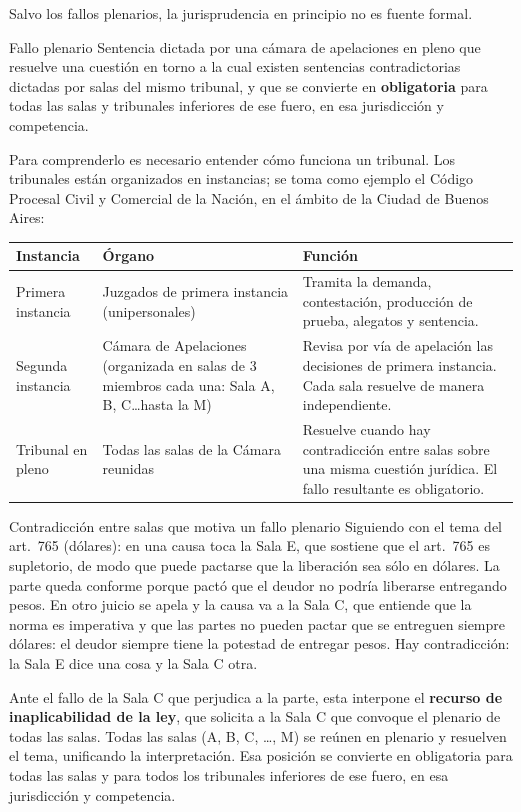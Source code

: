\documentclass[12pt,oneside]{book}
\begin{document}
Salvo los fallos plenarios, la jurisprudencia en principio no es fuente formal.

\begin{definition}{Fallo plenario}
Sentencia dictada por una cámara de apelaciones en pleno que resuelve una cuestión en torno a la cual existen sentencias contradictorias dictadas por salas del mismo tribunal, y que se convierte en \textbf{obligatoria} para todas las salas y tribunales inferiores de ese fuero, en esa jurisdicción y competencia.
\end{definition}

Para comprenderlo es necesario entender cómo funciona un tribunal. Los tribunales están organizados en instancias; se toma como ejemplo el Código Procesal Civil y Comercial de la Nación, en el ámbito de la Ciudad de Buenos Aires:

\begin{table}[H]
\centering
\begin{tabularx}{\textwidth}{>{\raggedright\arraybackslash}p{} >{\raggedright\arraybackslash}p{} >{\raggedright\arraybackslash}X}
\toprule
\textbf{Instancia} & \textbf{Órgano} & \textbf{Función} \\
\midrule
Primera instancia & Juzgados de primera instancia (unipersonales) & Tramita la demanda, contestación, producción de prueba, alegatos y sentencia. \\
\addlinespace
Segunda instancia & Cámara de Apelaciones (organizada en salas de 3 miembros cada una: Sala A, B, C\ldots hasta la M) & Revisa por vía de apelación las decisiones de primera instancia. Cada sala resuelve de manera independiente. \\
\addlinespace
Tribunal en pleno & Todas las salas de la Cámara reunidas & Resuelve cuando hay contradicción entre salas sobre una misma cuestión jurídica. El fallo resultante es obligatorio. \\
\bottomrule
\end{tabularx}
\end{table}

\begin{example}{Contradicción entre salas que motiva un fallo plenario}
Siguiendo con el tema del art.~765 (dólares): en una causa toca la Sala E, que sostiene que el art.~765 es supletorio, de modo que puede pactarse que la liberación sea sólo en dólares. La parte queda conforme porque pactó que el deudor no podría liberarse entregando pesos. En otro juicio se apela y la causa va a la Sala C, que entiende que la norma es imperativa y que las partes no pueden pactar que se entreguen siempre dólares: el deudor siempre tiene la potestad de entregar pesos. Hay contradicción: la Sala E dice una cosa y la Sala C otra.

Ante el fallo de la Sala C que perjudica a la parte, esta interpone el \textbf{recurso de inaplicabilidad de la ley}, que solicita a la Sala C que convoque el plenario de todas las salas. Todas las salas (A, B, C, \ldots, M) se reúnen en plenario y resuelven el tema, unificando la interpretación. Esa posición se convierte en obligatoria para todas las salas y para todos los tribunales inferiores de ese fuero, en esa jurisdicción y competencia.
\end{example}
\end{document}
